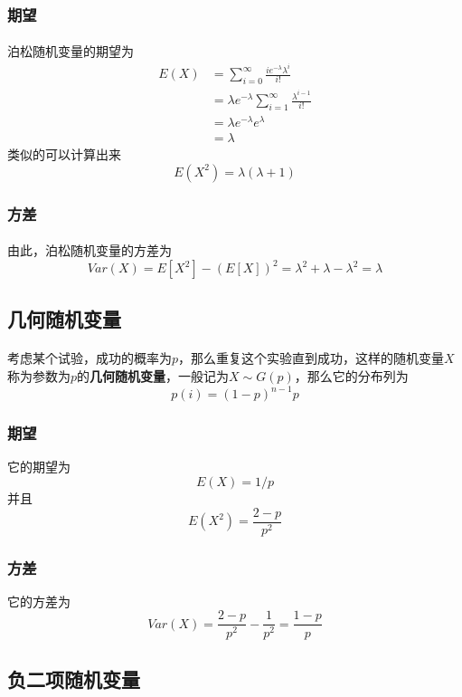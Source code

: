 \subsubsection{期望}
\paragraph{}
泊松随机变量的期望为
\begin{align*}
E(X) &= \sum_{i=0}^\infty \frac{i e^{-\lambda} \lambda^i }{i!}  \\
	    &= \lambda  e^{-\lambda} \sum_{i=1}^\infty \frac{\lambda^{i-1}}{i!} \\
	    &=  \lambda  e^{-\lambda} e^\lambda \\
	    &= \lambda
\end{align*}
类似的可以计算出来
$$
E(X^2) = \lambda(\lambda + 1)
$$

\subsubsection{方差}
\paragraph{}
由此，泊松随机变量的方差为
$$
Var(X) = E[X^2] - (E[X])^2 = \lambda^2 + \lambda - \lambda^2 = \lambda
$$


\subsection{几何随机变量}
\paragraph{}
考虑某个试验，成功的概率为$p$，那么重复这个实验直到成功，这样的随机变量$X$称为参数为$p$的\textbf{几何随机变量}，一般记为$X \sim G(p)$，那么它的分布列为
$$
p(i) = (1-p)^{n-1}p
$$

\subsubsection{期望}
它的期望为
$$
E(X) = 1/p
$$
并且
$$
E(X^2) = \frac{2-p}{p^2}
$$

\subsubsection{方差}
它的方差为
$$
Var(X) = \frac{2-p}{p^2} - \frac{1}{p^2} = \frac{1-p}{p}
$$

\subsection{负二项随机变量}
